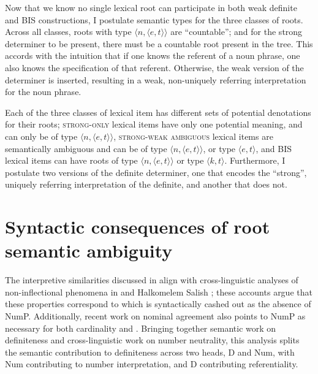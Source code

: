 \documentclass[output=paper,
modfonts
]{langscibook}
\begin{document}
Now that we know no single lexical root can participate in both weak definite and BIS constructions, I postulate semantic types for the three classes of roots. Across all classes, roots with type $\langle n ,\langle e,t\rangle\rangle$ are ``countable''; and for the strong determiner to be present, there must be a countable root present in the tree. This accords with the intuition that if one knows the referent of a noun phrase, one also knows the  specification of that referent. Otherwise, the weak version of the determiner is inserted, resulting in a weak, non-uniquely referring interpretation for the noun phrase. 

Each of the three classes of lexical item has different sets of potential denotations for their roots; \textsc{strong-only} lexical items have only one potential meaning, and can only be of type $\langle n, \langle e,t \rangle\rangle$, \textsc{strong-weak ambiguous} lexical items are semantically ambiguous and can be of type $\langle n, \langle e,t \rangle\rangle$, or type $\langle e,t \rangle$, and BIS lexical items can have roots of type $\langle n, \langle e,t \rangle\rangle$ or type $\langle k,t \rangle$. Furthermore, I postulate two versions of the definite determiner, one that encodes the ``strong'', uniquely referring interpretation of the definite, and another that does not. 

\section{Syntactic consequences of root semantic ambiguity}\label{sec:williams:4}

The interpretive similarities discussed in  align with cross-linguistic analyses of non-inflectional  phenomena in  \citep{Deprez2005} and Halkomelem Salish \citep{wiltschko2008}; these accounts argue that these properties correspond to  which is syntactically cashed out as the absence of NumP. Additionally, recent work on  nominal agreement \citep{Landau2016} also points to NumP as necessary for both cardinality and . Bringing together semantic work on definiteness and cross-linguistic work on number neutrality, this analysis splits the semantic contribution to definiteness across two heads, D and Num, with Num contributing to number interpretation, and D contributing referentiality. 
\end{document}
